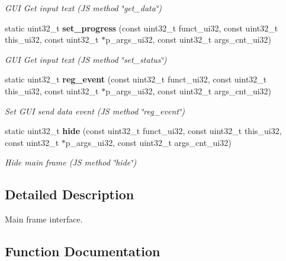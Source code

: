 \begin{DoxyCompactItemize}
\begin{DoxyCompactList}\small\item\em G\+UI Get input text (JS method \char`\"{}get\+\_\+data\char`\"{}) \end{DoxyCompactList}\item 
static uint32\+\_\+t \textbf{ set\+\_\+progress} (const uint32\+\_\+t funct\+\_\+ui32, const uint32\+\_\+t this\+\_\+ui32, const uint32\+\_\+t $\ast$p\+\_\+args\+\_\+ui32, const uint32\+\_\+t args\+\_\+cnt\+\_\+ui32)
\begin{DoxyCompactList}\small\item\em G\+UI Get input text (JS method \char`\"{}set\+\_\+status\char`\"{}) \end{DoxyCompactList}\item 
static uint32\+\_\+t \textbf{ reg\+\_\+event} (const uint32\+\_\+t funct\+\_\+ui32, const uint32\+\_\+t this\+\_\+ui32, const uint32\+\_\+t $\ast$p\+\_\+args\+\_\+ui32, const uint32\+\_\+t args\+\_\+cnt\+\_\+ui32)
\begin{DoxyCompactList}\small\item\em Set G\+UI send data event (JS method \char`\"{}reg\+\_\+event\char`\"{}) \end{DoxyCompactList}\item 
static uint32\+\_\+t \textbf{ hide} (const uint32\+\_\+t funct\+\_\+ui32, const uint32\+\_\+t this\+\_\+ui32, const uint32\+\_\+t $\ast$p\+\_\+args\+\_\+ui32, const uint32\+\_\+t args\+\_\+cnt\+\_\+ui32)
\begin{DoxyCompactList}\small\item\em Hide main frame (JS method \char`\"{}hide\char`\"{}) \end{DoxyCompactList}\end{DoxyCompactItemize}


\subsection{Detailed Description}
Main frame interface. 



\subsection{Function Documentation}
\mbox{\label{group__main__frame_ga8c521537b2065ae6bcc3a419e786d024}} 
